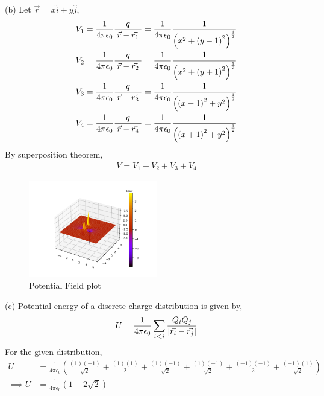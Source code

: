 \documentclass[12pt]{article}
\providecommand{\brak}[1]{\ensuremath{\left(#1\right)}}
\begin{document}
(b) Let $\vec{r} = x\hat{i} + y\hat{j}$,
\begin{align*}
    V_1 &= \frac{1}{4\pi\epsilon_0} \frac{q}{\abs{\vec{r} - \vec{r_1}}}  = \frac{1}{4\pi\epsilon_0} \frac{1}{\brak{x^2 + \brak{y - 1}^2}^{\frac{1}{2}}}\\
    V_2 &= \frac{1}{4\pi\epsilon_0} \frac{q}{\abs{\vec{r} - \vec{r_2}}}  = \frac{1}{4\pi\epsilon_0} \frac{1}{\brak{x^2 + \brak{y + 1}^2}^{\frac{1}{2}}}\\
    V_3 &= \frac{1}{4\pi\epsilon_0} \frac{q}{\abs{\vec{r} - \vec{r_3}}}  = \frac{1}{4\pi\epsilon_0} \frac{1}{\brak{\brak{x - 1}^2 + y^2}^{\frac{1}{2}}}\\
    V_4 &= \frac{1}{4\pi\epsilon_0} \frac{q}{\abs{\vec{r} - \vec{r_4}}}  = \frac{1}{4\pi\epsilon_0} \frac{1}{\brak{\brak{x + 1}^2 + y^2}^{\frac{1}{2}}}
\end{align*} 
By superposition theorem,
\begin{align*}
    V = V_1 + V_2 + V_3 + V_4
\end{align*}
\newpage

\begin{figure}
    \begin{center}
        \includegraphics[width=0.5\textwidth]{./q6/b_fig.png}
    \end{center}
    \caption{Potential Field plot}
\end{figure}

(c) Potential energy of a discrete charge distribution is given by,
\begin{align*}
    U = \frac{1}{4\pi\epsilon_0} \sum\limits_{i < j} \frac{Q_i Q_j}{\abs{\vec{r_i} - \vec{r_j}}}
\end{align*}
For the given distribution,
\begin{align*}
    U &= \frac{1}{4\pi\epsilon_0} \brak{  \frac{\brak{1}\brak{-1}}{\sqrt{2}} + \frac{\brak{1}\brak{1}}{2} + \frac{\brak{1}\brak{-1}}{\sqrt{2}} + \frac{\brak{1}\brak{-1}}{\sqrt{2}} + \frac{\brak{-1}\brak{-1}}{2} +  \frac{\brak{-1}\brak{1}}{\sqrt{2}} }\\
    \implies U &= \frac{1}{4\pi\epsilon_0} \brak{1 - 2\sqrt{2}} 
\end{align*}
\end{document}

